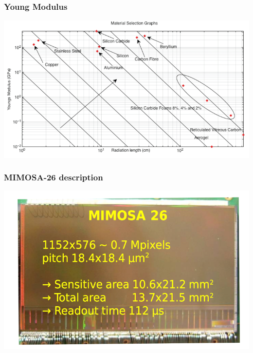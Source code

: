 \documentclass{beamer}
\begin{document}
\begin{frame}[plain]
\begin{columns}[t]
    \end{columns}

  \end{frame}


  \begin{frame}[plain]
    \frametitle{Young Modulus}

    \begin{center}
      \includegraphics[width = \textwidth]{Pictures/youngModulus_vs_radiationLength-004.jpg}
    \end{center}
  \end{frame}



  \begin{frame}[plain]
    \frametitle{MIMOSA-26 description}

    \begin{center}
      \includegraphics[width = \textwidth]{Pictures/mimosa26_shortDescription.png}
    \end{center}
  \end{frame}
\end{document}
